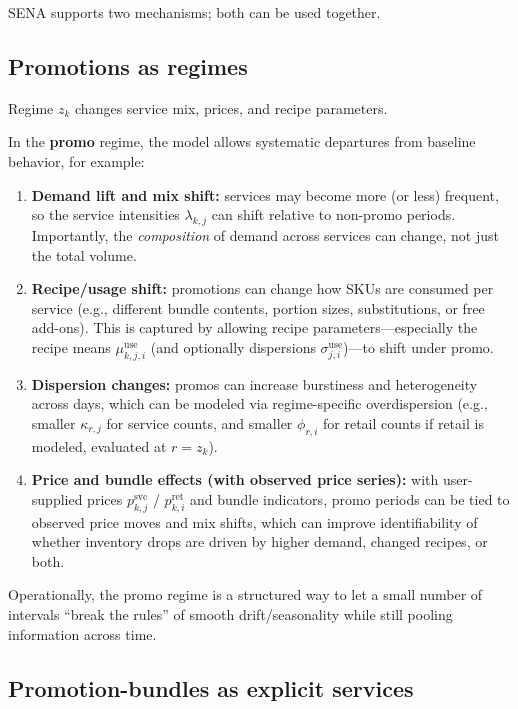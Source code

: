 \documentclass[11pt]{article}
\begin{document}
SENA supports two mechanisms; both can be used together.

\subsection{Promotions as regimes}

Regime $z_k$ changes service mix, prices, and recipe parameters.

In the \textbf{promo} regime, the model allows systematic departures from baseline behavior, for example:
\begin{enumerate}
  \item \textbf{Demand lift and mix shift:} services may become more (or less) frequent, so the service intensities $\lambda_{k,j}$ can shift relative to non-promo periods. Importantly, the \emph{composition} of demand across services can change, not just the total volume.

  \item \textbf{Recipe/usage shift:} promotions can change how SKUs are consumed per service (e.g., different bundle contents, portion sizes, substitutions, or free add-ons). This is captured by allowing recipe parameters---especially the recipe means $\mu^{\mathrm{use}}_{k,j,i}$ (and optionally dispersions $\sigma^{\mathrm{use}}_{j,i}$)---to shift under promo.

  \item \textbf{Dispersion changes:} promos can increase burstiness and heterogeneity across days, which can be modeled via regime-specific overdispersion (e.g., smaller $\kappa_{r,j}$ for service counts, and smaller $\phi_{r,i}$ for retail counts if retail is modeled, evaluated at $r=z_k$).

  \item \textbf{Price and bundle effects (with observed price series):} with user-supplied prices $p^{\mathrm{svc}}_{k,j}$ / $p^{\mathrm{ret}}_{k,i}$ and bundle indicators, promo periods can be tied to observed price moves and mix shifts, which can improve identifiability of whether inventory drops are driven by higher demand, changed recipes, or both.
\end{enumerate}

Operationally, the promo regime is a structured way to let a small number of intervals ``break the rules'' of smooth drift/seasonality while still pooling information across time.

\subsection{Promotion-bundles as explicit services}
\end{document}
